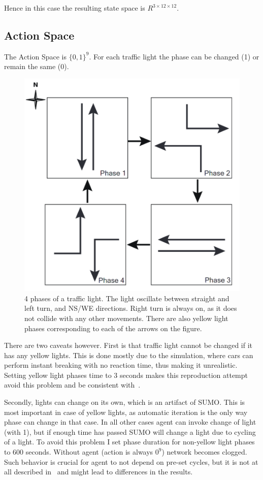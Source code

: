 \documentclass{article}
\begin{document}
    Hence in this case the resulting state space is $R^{3\times12\times12}$.

    \subsection{Action Space}
    The Action Space is $\{0, 1\}^9$. For each traffic light the phase can be changed (1) or remain the same (0).

    \begin{figure}[h]
        \centering
        \includegraphics[width=0.4\linewidth]{figs/phases.png}
        \caption{
            4 phases of a traffic light.
            The light oscillate between straight and left turn, and NS/WE directions.
            Right turn is always on, as it does not collide with any other movements.
            There are also yellow light phases corresponding to each of the arrows on the figure.
        }
        \label{fig:phases}
    \end{figure}

    There are two caveats however. First is that traffic light cannot be changed if it has any yellow lights.
    This is done mostly due to the simulation, where cars can perform instant breaking with no reaction time, thus making it unrealistic.
    Setting yellow light phases time to 3 seconds makes this reproduction attempt avoid this problem and be consistent with~\cite{utc}.

    Secondly, lights can change on its own, which is an artifact of SUMO.
    This is most important in case of yellow lights, as automatic iteration is the only way phase can change in that case.
    In all other cases agent can invoke change of light (with 1), but if enough time has passed SUMO will change a light due to cycling of a light.
    To avoid this problem I set phase duration for non-yellow light phases to 600 seconds.
    Without agent (action is always $0^9$) network becomes clogged.
    Such behavior is crucial for agent to not depend on pre-set cycles, but it is not at all described in~\cite{utc} and might lead to differences in the results.
\end{document}
